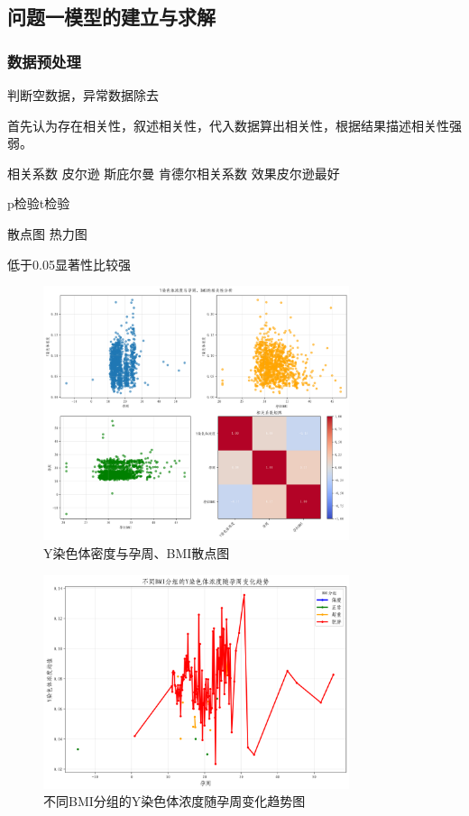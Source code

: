 \documentclass[withoutpreface,bwprint]{cumcmthesis} %
\begin{document}
\subsection{问题一模型的建立与求解}
\subsubsection{数据预处理}
判断空数据，异常数据除去

首先认为存在相关性，叙述相关性，代入数据算出相关性，根据结果描述相关性强弱。

相关系数 皮尔逊 斯庇尔曼 肯德尔相关系数 效果皮尔逊最好 

p检验t检验

散点图 热力图

低于0.05显著性比较强

\begin{figure}[H]
    \centering
    \includegraphics[width=0.8\textwidth]{../figure/q1_1.png}
    \caption{Y染色体密度与孕周、BMI散点图}
    \label{fig:heatmap}
\end{figure}

\begin{figure}[H]
    \centering
    \includegraphics[width=0.8\textwidth]{../figure/q1_2.png}
    \caption{不同BMI分组的Y染色体浓度随孕周变化趋势图}
    \label{fig:heatmap}
\end{figure}
\end{document}
